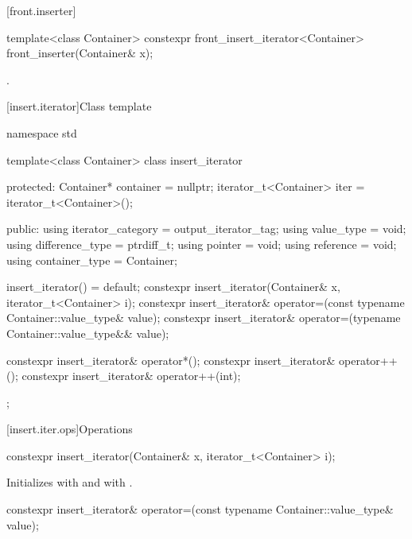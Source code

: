 [front.inserter]{}

%
\begin{itemdecl}
template<class Container>
  constexpr front_insert_iterator<Container> front_inserter(Container& x);
\end{itemdecl}

\begin{itemdescr}
\pnum
\returns
{}.
\end{itemdescr}

[insert.iterator]{Class template }

%
\begin{codeblock}
namespace std {
  template<class Container>
  class insert_iterator {
  protected:
    Container* container = nullptr;
    iterator_t<Container> iter = iterator_t<Container>();

  public:
    using iterator_category = output_iterator_tag;
    using value_type        = void;
    using difference_type   = ptrdiff_t;
    using pointer           = void;
    using reference         = void;
    using container_type    = Container;

    insert_iterator() = default;
    constexpr insert_iterator(Container& x, iterator_t<Container> i);
    constexpr insert_iterator& operator=(const typename Container::value_type& value);
    constexpr insert_iterator& operator=(typename Container::value_type&& value);

    constexpr insert_iterator& operator*();
    constexpr insert_iterator& operator++();
    constexpr insert_iterator& operator++(int);
  };
}
\end{codeblock}

[insert.iter.ops]{Operations}

%
\begin{itemdecl}
constexpr insert_iterator(Container& x, iterator_t<Container> i);
\end{itemdecl}

\begin{itemdescr}
\pnum
\effects
Initializes
with  and
with .
\end{itemdescr}

%
\begin{itemdecl}
constexpr insert_iterator& operator=(const typename Container::value_type& value);
\end{itemdecl}

